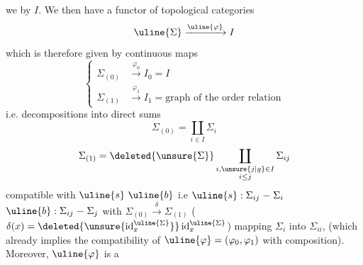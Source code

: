 we  by $I$. We then have a
 functor of topological categories 
\[
\uline{\Sigma}\xrightarrow{\uline{\varphi}}I
\]
which is therefore given by continuous maps
\[
\left\{\begin{aligned}
\Sigma_{(0)}&\xrightarrow{\varphi_0}I_0=I\\
\Sigma_{(1)}&\xrightarrow{\varphi_1}I_1=\text{graph of the order relation}
\end{aligned}\right.
\]
i.e. decompositions into direct sums
\[
\Sigma_{(0)}=\coprod_{i\in I}\Sigma_i
\]
\[
\Sigma_{(1)}=\deleted{\unsure{\Sigma}}\coprod_{\substack{i,\unsure{j|g}\in I\\i\leq j}}\Sigma_{ij}
\]
compatible with $\uline{s}\ \uline{b}$
i.e $\uline{s}:\Sigma_{ij}\mathrel{-}\Sigma_i$
$\uline{b}:\Sigma_{ij}\mathrel{-}\Sigma_j$
with $\Sigma_{(0)}\xrightarrow{\delta}\Sigma_{(1)}$ ($\delta(x)=\deleted{\unsure{\operatorname{id}^{\uline{\Sigma}}_x}}\operatorname{id}^{\uline{\Sigma}}_x$)
mapping $\Sigma_i$ into $\Sigma_{ii}$,  (which
already implies the compatibility of $\uline{\varphi}=(\varphi_0,\varphi_1)$ with
composition). Moreover, $\uline{\varphi}$ is a
